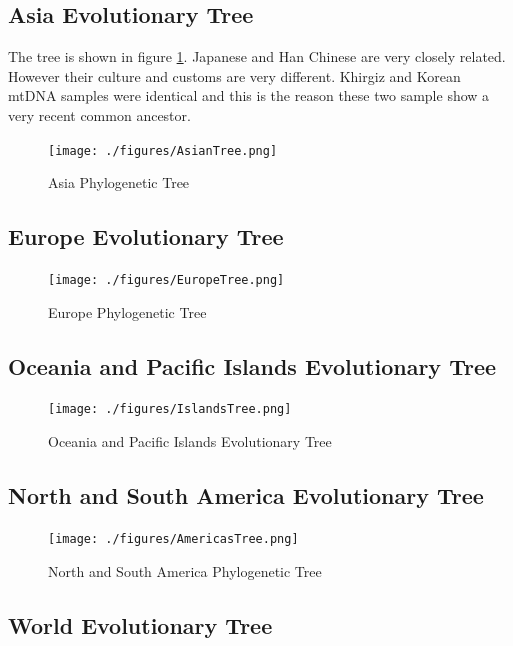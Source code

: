\documentclass[conference]{IEEEtran}
\begin{document}
\FloatBarrier
\subsection{Asia Evolutionary Tree}

The tree is shown in figure \ref{AsianTree}. Japanese and Han Chinese are very closely related. However their culture and customs are very different. Khirgiz and Korean mtDNA samples were identical and this is the reason these two sample show a very recent common ancestor.

\begin{figure}[!t]
\centering
\texttt{[image: ./figures/AsianTree.png]}
\caption{Asia Phylogenetic Tree}
\label{AsianTree}
\end{figure}

\FloatBarrier
\subsection{Europe Evolutionary Tree}

\begin{figure}[!t]
\centering
\texttt{[image: ./figures/EuropeTree.png]}
\caption{Europe Phylogenetic Tree}
\label{EuropeTree}
\end{figure}

\FloatBarrier
\subsection{Oceania and Pacific Islands Evolutionary Tree}

\begin{figure}[!t]
\centering
\texttt{[image: ./figures/IslandsTree.png]}
\caption{Oceania and Pacific Islands Evolutionary Tree}
\label{IslandsTree}
\end{figure}

\FloatBarrier
\subsection{North and South America Evolutionary Tree}

\begin{figure}[!t]
\centering
\texttt{[image: ./figures/AmericasTree.png]}
\caption{North and South America Phylogenetic Tree}
\label{AmericasTree}
\end{figure}

\FloatBarrier
\subsection{World Evolutionary Tree}
\end{document}
